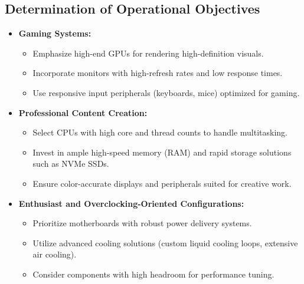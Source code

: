\documentclass{article}
\begin{document}
\subsection{Determination of Operational Objectives}
\begin{itemize}[itemsep=5pt]
    \item \textbf{Gaming Systems:} 
    \begin{itemize}[label=--]
        \item Emphasize high-end GPUs for rendering high-definition visuals.
        \item Incorporate monitors with high-refresh rates and low response times.
        \item Use responsive input peripherals (keyboards, mice) optimized for gaming.
    \end{itemize}
    \item \textbf{Professional Content Creation:}
    \begin{itemize}[label=--]
        \item Select CPUs with high core and thread counts to handle multitasking.
        \item Invest in ample high-speed memory (RAM) and rapid storage solutions such as NVMe SSDs.
        \item Ensure color-accurate displays and peripherals suited for creative work.
    \end{itemize}
    \item \textbf{Enthusiast and Overclocking-Oriented Configurations:}
    \begin{itemize}[label=--]
        \item Prioritize motherboards with robust power delivery systems.
        \item Utilize advanced cooling solutions (custom liquid cooling loops, extensive air cooling).
        \item Consider components with high headroom for performance tuning.
    \end{itemize}
\end{itemize}
\end{document}
